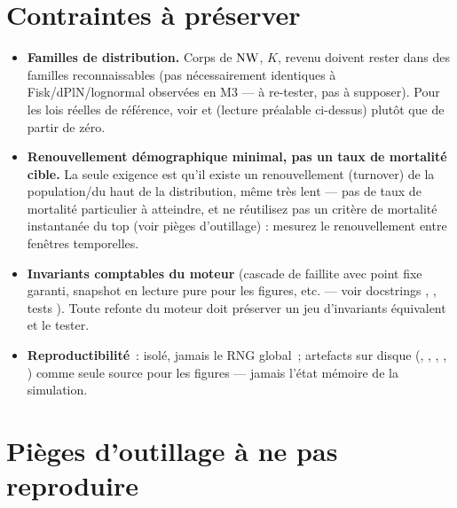\section*{Contraintes à préserver}

\begin{itemize}[leftmargin=*]
  \item \textbf{Familles de distribution.} Corps de $\mathrm{NW}$, $K$, revenu
    doivent rester dans des familles reconnaissables (pas nécessairement
    identiques à Fisk/dPlN/lognormal observées en M3 — à re-tester, pas à
    supposer). Pour les lois réelles de référence, voir
     et
     (lecture
    préalable ci-dessus) plutôt que de partir de zéro.
  \item \textbf{Renouvellement démographique minimal, pas un taux de
    mortalité cible.} La seule exigence est qu'il existe un renouvellement
    (turnover) de la population/du haut de la distribution, même très
    lent — pas de taux de mortalité particulier à atteindre, et ne
    réutilisez pas un critère de mortalité instantanée du top (voir pièges
    d'outillage) : mesurez le renouvellement entre fenêtres temporelles.
  \item \textbf{Invariants comptables du moteur} (cascade de faillite avec
    point fixe garanti, snapshot en lecture pure pour les figures, etc. —
    voir docstrings , , tests
    ). Toute refonte du moteur doit préserver un jeu
    d'invariants équivalent et le tester.
  \item \textbf{Reproductibilité}~:  isolé,
    jamais le RNG global~; artefacts sur disque (,
    , , ,
    ) comme seule source pour les figures — jamais
    l'état mémoire de la simulation.
\end{itemize}

\section*{Pièges d'outillage à ne pas reproduire}


